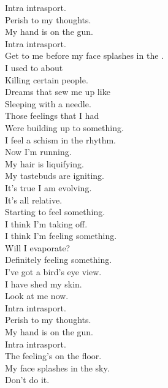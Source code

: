 Intra intrasport. \\
Perish to my thoughts. \\
My hand is on the gun. \\
Intra intrasport. \\
Get to me before my face splashes in the . \\

I used to  about \\
Killing certain people. \\
Dreams that sew me up like \\
Sleeping with a needle. \\
Those feelings that I had \\
Were building up to something. \\
I feel a schism in the rhythm. \\
Now I'm running. \\

My hair is liquifying. \\
My tastebuds are igniting. \\
It's true I am evolving. \\
It's all relative. \\

Starting to feel something. \\
I think I'm taking off. \\
I think I'm feeling something. \\
Will I evaporate? \\
Definitely feeling something. \\
I've got a bird's eye view. \\
I have shed my skin. \\
Look at me now. \\

Intra intrasport. \\
Perish to my thoughts. \\
My hand is on the gun. \\
Intra intrasport. \\
The feeling's on the floor. \\
My face splashes in the sky. \\

Don't do it. \\




